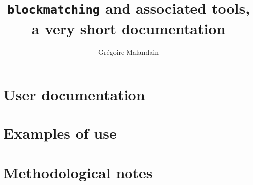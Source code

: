 \documentclass[10pt]{report}
\begin{document}
\title{\texttt{blockmatching} and associated tools, a very short documentation}
\author{Gr\'egoire Malandain}
\maketitle

\tableofcontents



\part{User documentation}

 

 

\part{Examples of use}



\part{Methodological notes}







% 


% 


% 
\end{document}
